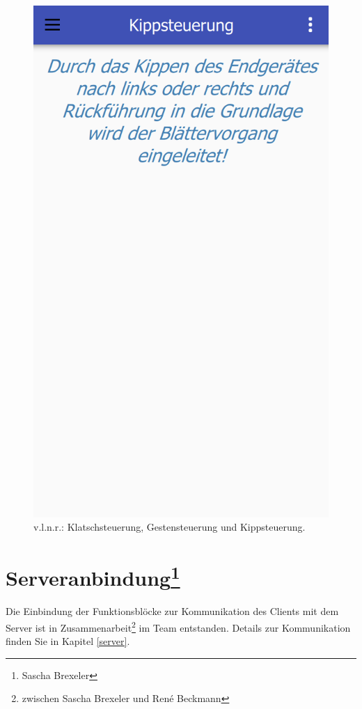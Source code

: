 \begin{figure}[ht!]
\begin{minipage}{0.31\linewidth}
		\includegraphics[scale=0.5]{GUI/Bilder/Kippsteuerung.PNG}
	\end{minipage}
	\caption[v.l.n.r.: Klatschsteuerung, Gestensteuerung und Kippsteuerung]{v.l.n.r.: Klatschsteuerung, Gestensteuerung und Kippsteuerung.\footnotemark}
	\label{client:InformationenBedienhilfen}
\end{figure}

\section[Serveranbindung]{Serveranbindung\footnote{Sascha Brexeler}}
\label{client-Serveranbindung}
Die Einbindung der Funktionsblöcke zur Kommunikation des Clients mit dem Server ist in Zusammenarbeit\footnote{zwischen Sascha Brexeler und René Beckmann} im Team entstanden. Details zur Kommunikation finden Sie in Kapitel \ref{server}.


